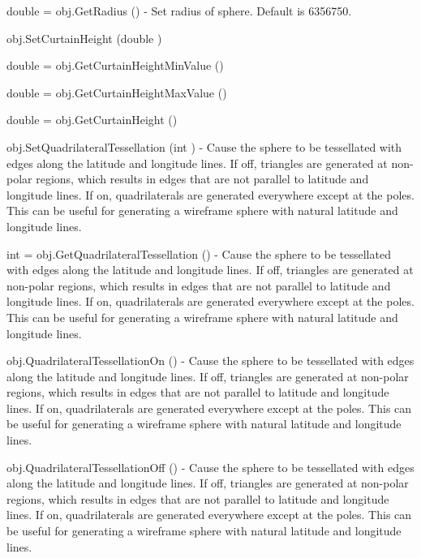 \begin{DoxyItemize}
\item {\ttfamily double = obj.\-Get\-Radius ()} -\/ Set radius of sphere. Default is 6356750.  
\item {\ttfamily obj.\-Set\-Curtain\-Height (double )}  
\item {\ttfamily double = obj.\-Get\-Curtain\-Height\-Min\-Value ()}  
\item {\ttfamily double = obj.\-Get\-Curtain\-Height\-Max\-Value ()}  
\item {\ttfamily double = obj.\-Get\-Curtain\-Height ()}  
\item {\ttfamily obj.\-Set\-Quadrilateral\-Tessellation (int )} -\/ Cause the sphere to be tessellated with edges along the latitude and longitude lines. If off, triangles are generated at non-\/polar regions, which results in edges that are not parallel to latitude and longitude lines. If on, quadrilaterals are generated everywhere except at the poles. This can be useful for generating a wireframe sphere with natural latitude and longitude lines.  
\item {\ttfamily int = obj.\-Get\-Quadrilateral\-Tessellation ()} -\/ Cause the sphere to be tessellated with edges along the latitude and longitude lines. If off, triangles are generated at non-\/polar regions, which results in edges that are not parallel to latitude and longitude lines. If on, quadrilaterals are generated everywhere except at the poles. This can be useful for generating a wireframe sphere with natural latitude and longitude lines.  
\item {\ttfamily obj.\-Quadrilateral\-Tessellation\-On ()} -\/ Cause the sphere to be tessellated with edges along the latitude and longitude lines. If off, triangles are generated at non-\/polar regions, which results in edges that are not parallel to latitude and longitude lines. If on, quadrilaterals are generated everywhere except at the poles. This can be useful for generating a wireframe sphere with natural latitude and longitude lines.  
\item {\ttfamily obj.\-Quadrilateral\-Tessellation\-Off ()} -\/ Cause the sphere to be tessellated with edges along the latitude and longitude lines. If off, triangles are generated at non-\/polar regions, which results in edges that are not parallel to latitude and longitude lines. If on, quadrilaterals are generated everywhere except at the poles. This can be useful for generating a wireframe sphere with natural latitude and longitude lines.  
\end{DoxyItemize}